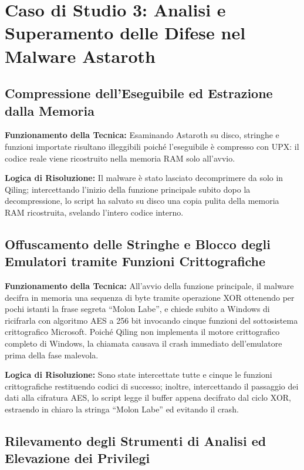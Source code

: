 \documentclass[11pt, a4paper]{article}
\begin{document}
	\section{Caso di Studio 3: Analisi e Superamento delle Difese nel Malware Astaroth}
	
	\subsection{Compressione dell'Eseguibile ed Estrazione dalla Memoria}
	
	\textbf{Funzionamento della Tecnica:} Esaminando Astaroth su disco, stringhe e funzioni importate risultano illeggibili poiché l'eseguibile è compresso con UPX: il codice reale viene ricostruito nella memoria RAM solo all'avvio.
	
	\textbf{Logica di Risoluzione:} Il malware è stato lasciato decomprimere da solo in Qiling; intercettando l'inizio della funzione principale subito dopo la decompressione, lo script ha salvato su disco una copia pulita della memoria RAM ricostruita, svelando l'intero codice interno.
	
	\subsection{Offuscamento delle Stringhe e Blocco degli Emulatori tramite Funzioni Crittografiche}
	
	\textbf{Funzionamento della Tecnica:} All'avvio della funzione principale, il malware decifra in memoria una sequenza di byte tramite operazione XOR ottenendo per pochi istanti la frase segreta ``Molon Labe'', e chiede subito a Windows di ricifrarla con algoritmo AES a 256 bit invocando cinque funzioni del sottosistema crittografico Microsoft. Poiché Qiling non implementa il motore crittografico completo di Windows, la chiamata causava il crash immediato dell'emulatore prima della fase malevola.
	
	\textbf{Logica di Risoluzione:} Sono state intercettate tutte e cinque le funzioni crittografiche restituendo codici di successo; inoltre, intercettando il passaggio dei dati alla cifratura AES, lo script legge il buffer appena decifrato dal ciclo XOR, estraendo in chiaro la stringa ``Molon Labe'' ed evitando il crash.
	
	\subsection{Rilevamento degli Strumenti di Analisi ed Elevazione dei Privilegi}
	
\end{document}
